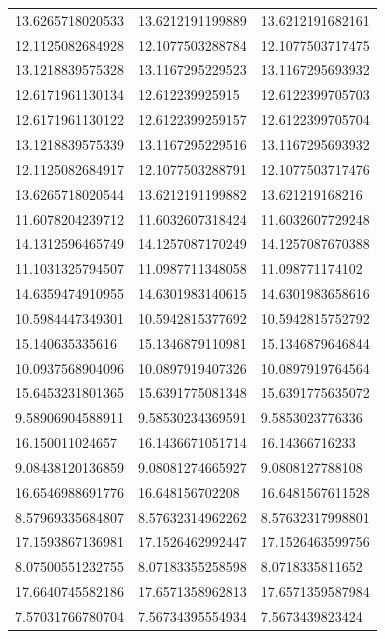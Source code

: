 \documentclass[10pt,a4paper]{article}
\begin{document}
\begin{center}
\begin{longtable}{ |p{2.8cm}|p{2.8cm}|p{2.8cm}| }
    13.6265718020533  & 13.6212191199889  & 13.6212191682161    \\
    12.1125082684928  & 12.1077503288784  & 12.1077503717475    \\
    13.1218839575328  & 13.1167295229523  & 13.1167295693932    \\
    12.6171961130134  & 12.612239925915   & 12.6122399705703    \\
    12.6171961130122  & 12.6122399259157  & 12.6122399705704    \\
    13.1218839575339  & 13.1167295229516  & 13.1167295693932    \\
    12.1125082684917  & 12.1077503288791  & 12.1077503717476    \\
    13.6265718020544  & 13.6212191199882  & 13.621219168216     \\
    11.6078204239712  & 11.6032607318424  & 11.6032607729248    \\
    14.1312596465749  & 14.1257087170249  & 14.1257087670388    \\
    11.1031325794507  & 11.0987711348058  & 11.098771174102     \\
    14.6359474910955  & 14.6301983140615  & 14.6301983658616    \\
    10.5984447349301  & 10.5942815377692  & 10.5942815752792    \\
    15.140635335616   & 15.1346879110981  & 15.1346879646844    \\
    10.0937568904096  & 10.0897919407326  & 10.0897919764564    \\
    15.6453231801365  & 15.6391775081348  & 15.6391775635072    \\
    9.58906904588911  & 9.58530234369591  & 9.5853023776336     \\
    16.150011024657   & 16.1436671051714  & 16.14366716233      \\
    9.08438120136859  & 9.08081274665927  & 9.0808127788108     \\
    16.6546988691776  & 16.648156702208   & 16.6481567611528    \\
    8.57969335684807  & 8.57632314962262  & 8.57632317998801    \\
    17.1593867136981  & 17.1526462992447  & 17.1526463599756    \\
    8.07500551232755  & 8.07183355258598  & 8.0718335811652     \\
    17.6640745582186  & 17.6571358962813  & 17.6571359587984    \\
    7.57031766780704  & 7.56734395554934  & 7.5673439823424     \\

\end{longtable}
\end{center}
\end{document}

